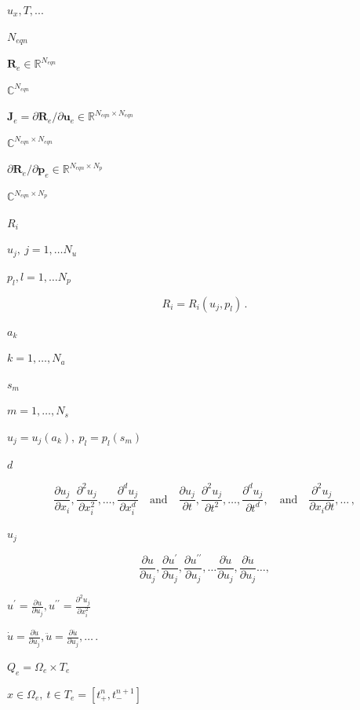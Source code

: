 \documentclass{article}
\begin{document}
$u_x, T, ...$
\pagebreak

$ N_{eqn} $
\pagebreak

$ \mathbf{R}_e \in \mathbb{R}^{N_{eqn}} $
\pagebreak

$ \mathbb{C}^{N_{eqn}} $
\pagebreak

$ \mathbf{J}_e = \partial \mathbf{R}_e/ \partial \mathbf{u}_e \in \mathbb{R}^{N_{eqn} \times N_{eqn}} $
\pagebreak

$ \mathbb{C}^{N_{eqn} \times N_{eqn}} $
\pagebreak

$ \partial \mathbf{R}_e/ \partial \textbf{p}_e \in \mathbb{R}^{N_{eqn} \times N_{p}} $
\pagebreak

$ \mathbb{C}^{N_{eqn} \times N_{p}} $
\pagebreak

$R_i$
\pagebreak

$u_j,\ j=1,\dots N_{u}$
\pagebreak

$p_l,  l=1,\dots N_{p}$
\pagebreak

\[R_i = R_i(u_j, p_l)\,.\]
\pagebreak

$a_k$
\pagebreak

$k= 1, \dots, N_{a}$
\pagebreak

$s_m$
\pagebreak

$m= 1, \dots, N_{s}$
\pagebreak

$u_j = u_j(a_k),\ p_l = p_l(s_m)$
\pagebreak

$d$
\pagebreak

\[\frac{\partial u_j}{\partial x_i},  \frac{\partial^2 u_j}{\partial x_i^2}, \dots, \frac{\partial^d u_j}{\partial x_i^d} 
\quad \mbox{and} \quad
\frac{\partial u_j}{\partial t}, \frac{\partial^2 u_j}{\partial t^2}, \dots, \frac{\partial^d u_j}{\partial t^d},
\quad \mbox{and} \quad
\frac{\partial^2 u_j}{\partial x_i \partial t}, \dots\,,\]
\pagebreak

$u_j$
\pagebreak

\[\frac{\partial u}{\partial u_j}, \frac{\partial u^{\prime}}{\partial u_j}, \frac{\partial u^{\prime\prime}}{\partial u_j}, \dots \frac{\partial \dot{u}}{\partial u_j}, \frac{\partial \ddot{u}}{\partial u_j} \dots,\]
\pagebreak

$u^{\prime} = \frac{\partial u}{\partial u_j}, u^{\prime \prime} = \frac{\partial^2 u_j}{\partial x_i^2}$
\pagebreak

$\dot{u} = \frac{\partial \dot{u}}{\partial u_j}, \ddot{u} = \frac{\partial \ddot{u}}{\partial u_j}, \dots \,.$
\pagebreak

$Q_e = \Omega_e \times T_e$
\pagebreak

$x \in \Omega_e,\ t \in T_e = [ t^n_+, t^{n+1}_- ]$
\pagebreak
\end{document}
